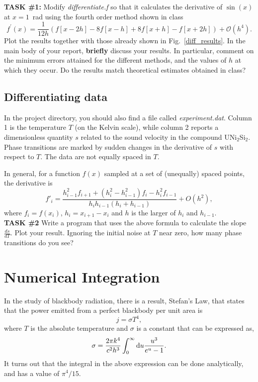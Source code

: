 \documentclass{article}
\begin{document}
{\bf TASK \#1:}  Modify {\it differentiate.f} so that it calculates the derivative of 
$\sin(x)$ at $x=1$~rad using the fourth order method
shown in class
$$
f^\prime(x) = \frac{1}{12h} \left( f[x-2h] - 8f[x-h] + 8f[x+h] - f[x+2h] \right) + \mathcal{O}(h^4).
$$
Plot the results together with those already shown in Fig.~\ref{diff_results}.  
In the main body of your report, {\bf briefly} discuss your results. In particular, comment on the minimum errors
attained for the different methods, and the values of $h$ at which they occur.   Do the results match 
theoretical estimates obtained in class?

\subsection{Differentiating data}

In the project directory, you should also find a file called {\it experiment.dat}.  Column 1 is the temperature $T$
(on the Kelvin scale), while column 2 reports a dimensionless quantity $s$ related to the sound velocity
in the compound UNi$_2$Si$_2$.  Phase transitions are marked by sudden changes in the derivative of 
$s$ with respect to $T$.  The data are not equally spaced in $T$.

In general, for a function $f(x)$ sampled at a set of (unequally) spaced points, the derivative is
$$
f'_i=\frac{h^2_{i-1} f_{i+1}+(h^2_i-h^2_{i-1})f_i-h^2_i f_{i-1}}{h_i h_{i-1} (h_i+h_{i-1})}
+O(h^2),
$$
where $f_i=f(x_i)$, $h_i=x_{i+1}-x_i$ and $h$ is the larger of $h_i$ and $h_{i-1}$.
\\

{\bf TASK \#2}
Write a program that uses the above formula to calculate the slope $\frac{d s}{dT}$.  Plot your 
result.  Ignoring the initial noise at $T$ near zero, how many phase transitions do you see? 

\section{Numerical Integration}

In the study of blackbody radiation, there is a result, Stefan's Law, that states that the power
emitted from a perfect blackbody per unit area is
$$
j=\sigma T^4,
$$
where $T$ is the absolute temperature and $\sigma$ is a constant that can be expressed as,
$$
\sigma = \frac{2 \pi k^4}{c^2 h^3} \int_0^\infty {\rm d}u \frac{u^3}{e^u -1}.
$$
It turns out that the integral in the above expression can be done analytically, and has a value of $\pi^4/15$.
\\
\end{document}
